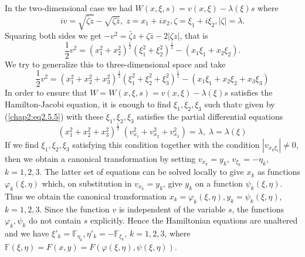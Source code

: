 In the two-dimensional case we had $W(x, \xi, s) = v(x, \xi) - \lambda (\xi) s$  where
$$
iv = \sqrt{\bar{\zeta} z} - \sqrt{\zeta \bar{z}}, \; z = x_1 + ix_2, \zeta = \xi_1 + i \xi_2, |\zeta| = \lambda. 
$$
Squaring both sides we get $-v^2 = \bar{\zeta} z + \zeta \bar{z} - 2|\zeta z|$, that is 
$$
\frac{1}{2} v^2 = (x^2_1 + x^2_2)^{\frac{1}{2}} (\xi^2_1 + \xi^2_2)^{\frac{1}{2}} - (x_1 \xi_1 + x_2 \xi_2). 
$$ 
We try to generalize this to three-dimensional space and take 
\begin{equation*}
\frac{1}{2} v^2 = (x^2_1 + x^2_2 + x^2_3)^{\frac{1}{2}} (\xi^2_1 + \xi^2_2 + \xi^2_3 )^{\frac{1}{2}} - (x_1 \xi_1 + x_2 \xi_2 + x_3 \xi_3) \tag{2.5.5}\label{chap2:eq2.5.5} 
\end{equation*}
In order to  ensure that $W = W(x, \xi, s) = v(x, \xi) - \lambda(\xi)s$ satisfies the Hamilton-Jacobi equation, it is enough to find $\xi_1, \xi_2, \xi_3$ such that\pageoriginale $v$ given by (\ref{chap2:eq2.5.5}) with these $\xi_1, \xi_2,\xi_3$ satisfies the partial differential equations
\begin{equation*}
(x^2_1 + x^2_2 + x^2_3)^{\frac{1}{2}} \; (v^2_{x_1} + v^2_{x_2} + v^2_{x_3}) = \lambda, \; \lambda = \lambda (\xi)\tag{2.5.6}\label{chap2:eq2.5.6} 
\end{equation*}
If we find $\xi_1, \xi_2, \xi_3$ satisfying this condition together with the condition $|v_{x_k \xi_l}| \neq 0$, then we obtain a canonical transformation by setting $v_{x_k} = y_k$, $v_{\xi_k} =  - \eta_{k}$, $k = 1,2,3$. The latter set of equations can be solved locally to give $x_k$ as functions $\varphi_k(\xi, \eta)$ which, on substitution in $v_{x_k} = y_k$, give $y_k$ on a function $\psi_k(\xi, \eta)$. Thus we obtain the canonical transformation $x_k = \varphi_k(\xi, \eta), y_k = \psi_k (\xi, \eta)$, $k = 1,2,3$. Since the function $v$ is independent of the variable $s$, the functions $\varphi_k , \psi_k$ do not contain $s$ explicitly. Hence the Hamiltonian equations are unaltered and we have $\xi'_k = \mathbb{F}_{\eta_k}, \eta'_k = -\mathbb{F}_{\xi_k}$, $k = 1,2,3$, where $\mathbb{F} (\xi, \eta) = F(x,y) = F(\varphi (\xi, \eta), \psi(\xi, \eta))$.

